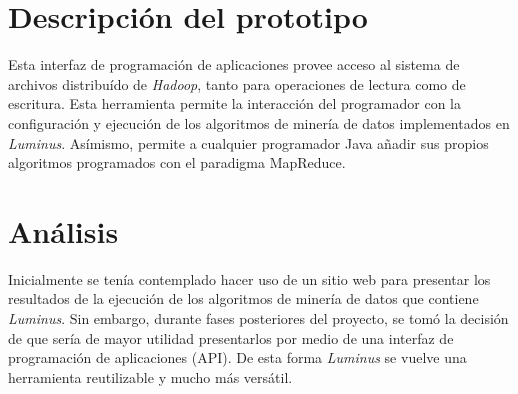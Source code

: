 \section{Descripción del prototipo}
Esta interfaz de programación de aplicaciones provee acceso al sistema de archivos distribuído de \emph{Hadoop}, tanto para operaciones de lectura como de escritura. Esta herramienta permite la interacción del programador con la configuración y ejecución de los algoritmos de minería de datos implementados en \emph{Luminus}. Asímismo, permite a cualquier programador Java añadir sus propios algoritmos programados con el paradigma MapReduce.
\section{Análisis}
Inicialmente se tenía contemplado hacer uso de un sitio web para presentar los resultados de la ejecución de los algoritmos de minería de datos que contiene \emph{Luminus}. Sin embargo, durante fases posteriores del proyecto, se tomó la decisión de que sería de mayor utilidad presentarlos por medio de una interfaz de programación de aplicaciones (API). De esta forma \emph{Luminus} se vuelve una herramienta reutilizable y mucho más versátil.
